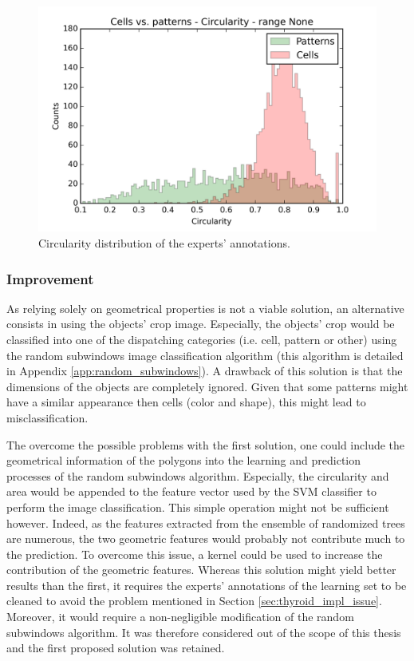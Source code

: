\begin{figure}
	\center
 	\includegraphics[scale=0.75]{image/cells_patterns_circ.png}
	\caption{Circularity distribution of the experts' annotations.}
	\label{fig:hist_circ_cell_vs_pattern}
\end{figure}


\subsubsection{Improvement}

As relying solely on geometrical properties is not a viable solution, an alternative consists in using the objects' crop image. Especially, the objects' crop would be classified into one of the dispatching categories (i.e. cell, pattern or other) using the random subwindows image classification algorithm \cite{Maree201617} (this algorithm is detailed in Appendix \ref{app:random_subwindows}). A drawback of this solution is that the dimensions of the objects are completely ignored. Given that some patterns might have a similar appearance then cells (color and shape), this might lead to misclassification. 

The overcome the possible problems with the first solution, one could include the geometrical information of the polygons into the learning and prediction processes of the random subwindows algorithm. Especially, the circularity and area would be appended to the feature vector used by the SVM classifier to perform the image classification. This simple operation might not be sufficient however. Indeed, as the features extracted from the ensemble of randomized trees are numerous, the two geometric features would probably not contribute much to the prediction. To overcome this issue, a kernel could be used to increase the contribution of the geometric features. Whereas this solution might yield better results than the first, it requires the experts' annotations of the learning set to be cleaned to avoid the problem mentioned in Section \ref{sec:thyroid_impl_issue}. Moreover, it would require a non-negligible modification of the random subwindows algorithm. It was therefore considered out of the scope of this thesis and the first proposed solution was retained.

